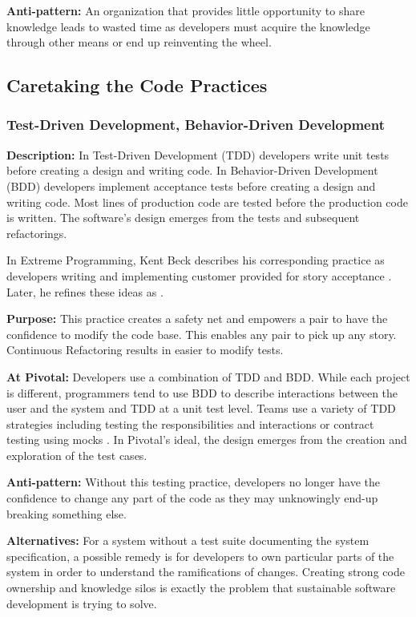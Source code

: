 \textbf{Anti-pattern:} An organization that provides little opportunity to share knowledge leads to wasted time as developers must acquire the knowledge through other means or end up reinventing the wheel.
\subsection{Caretaking the Code Practices}
\subsubsection{Test-Driven Development, Behavior-Driven Development}
\textbf{Description:} In Test-Driven Development (TDD) developers write unit tests before creating a design and writing code. In Behavior-Driven Development (BDD) developers implement acceptance tests before creating a design and writing code. Most lines of production code are tested before the production code is written. The software’s design emerges from the tests and subsequent refactorings.

In Extreme Programming, Kent Beck describes his corresponding  practice as developers writing  and implementing customer provided  for story acceptance \cite{BeckExtremeProgramming1999}. Later, he refines these ideas as  \cite{BeckExtremeProgramming2004}. 

\textbf{Purpose:} This practice creates a safety net and empowers a pair to have the confidence to modify the code base. This enables any pair to pick up any story. Continuous Refactoring results in easier to modify tests.

\textbf{At Pivotal:} Developers use a combination of TDD and BDD. While each project is different, programmers tend to use BDD to describe interactions between the user and the system and TDD at a unit test level. Teams use a variety of TDD strategies including testing the responsibilities and interactions \cite{Goose} or contract testing using mocks \cite{RainsbergerIntegrationTestsYouTube}. In Pivotal’s ideal, the design emerges from the creation and exploration of the test cases. 

\textbf{Anti-pattern:} Without this testing practice, developers no longer have the confidence to change any part of the code as they may unknowingly end-up breaking something else. 

\textbf{Alternatives:} For a system without a test suite documenting the system specification, a possible remedy is for developers to own particular parts of the system in order to understand the ramifications of changes. Creating strong code ownership and knowledge silos is exactly the problem that sustainable software development is trying to solve.

